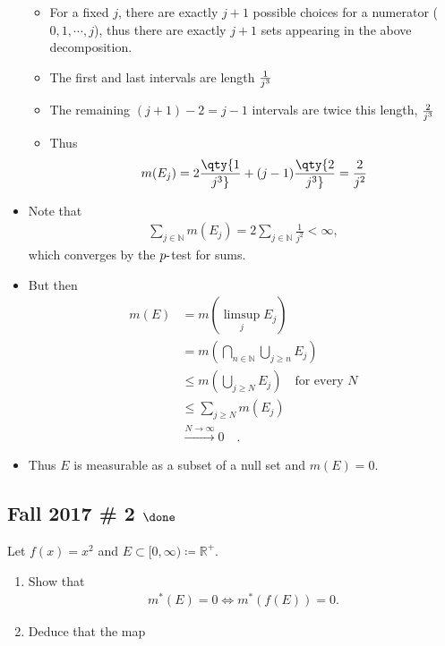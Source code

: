 \begin{solution}
\begin{itemize}
  \begin{itemize}
  \item
    For a fixed \(j\), there are exactly \(j+1\) possible choices for a
    numerator (\(0, 1, \cdots, j\)), thus there are exactly \(j+1\) sets
    appearing in the above decomposition.
  \item
    The first and last intervals are length \(1 \over j^3\)
  \item
    The remaining \((j+1)-2 = j-1\) intervals are twice this length,
    \(2 \over j^3\)
  \item
    Thus
    \begin{align*}
    m(E_j) = 2 \qty{1 \over j^3} + (j-1) \qty{2 \over j^3} = {2 \over j^2}
    \end{align*}
  \end{itemize}
\item
  Note that
  \begin{align*}
  \sum_{j\in {\mathbb{N}}} m(E_j) =  2\sum_{j\in {\mathbb{N}}} \frac 1 {j^2} < \infty
  ,\end{align*}
  which converges by the \(p{\hbox{-}}\)test for sums.
\item
  But then
  \begin{align*}
  m(E) 
  &= m(\limsup_j E_j) \\
  &= m(\displaystyle\bigcap_{n\in {\mathbb{N}}} \displaystyle\bigcup_{j\geq n} E_j) \\
  &\leq m(\displaystyle\bigcup_{j\geq N} E_j) \quad\text{for every } N \\
  &\leq \sum_{j\geq N} m(E_j) \\
  &\overset{N\to\infty}\to 0 \quad\text{}
  .\end{align*}
\item
  Thus \(E\) is measurable as a subset of a null set and \(m(E) = 0\).
\end{itemize}

\end{solution}

\hypertarget{fall-2017-2-done}{%
\subsection{\texorpdfstring{Fall 2017 \# 2
\(\done\)}{Fall 2017 \# 2 \textbackslash done}}\label{fall-2017-2-done}}

Let \(f(x) = x^2\) and
\(E \subset [0, \infty) \coloneqq{\mathbb{R}}^+\).

\begin{enumerate}
\def\labelenumi{\arabic{enumi}.}
\item
  Show that
  \begin{align*}
  m^*(E) = 0 \iff m^*(f(E)) = 0.
  \end{align*}
\item
  Deduce that the map
\end{enumerate}

